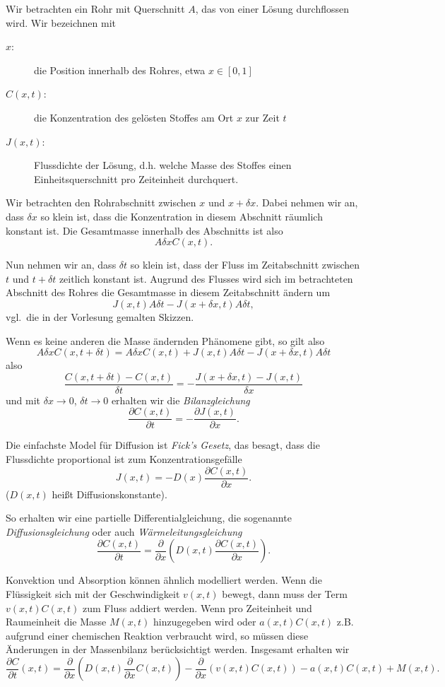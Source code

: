 \documentclass[12pt,a4paper]{book}
\theoremstyle{break}
\theoremstyle{nonumberplain}
\newcommand{\1}{\mathbbm{1}} 			      	%
\begin{document}
Wir betrachten ein Rohr mit Querschnitt $A$, das von einer Lösung durchflossen wird. Wir bezeichnen mit
\begin{description}
\item[$x$:] die Position innerhalb des Rohres, etwa $x\in [0,1]$
\item[$C(x,t)$:] die Konzentration des gelösten Stoffes 
am Ort $x$ zur Zeit $t$
\item[$J(x,t)$:] Flussdichte der Lösung, d.h. welche Masse des Stoffes
einen Einheitsquerschnitt pro Zeiteinheit durchquert.
\end{description}

Wir betrachten den Rohrabschnitt zwischen $x$ und $x+\delta x$. Dabei nehmen wir an, dass
$\delta x$ so klein ist, dass die Konzentration in diesem Abschnitt
räumlich konstant ist. Die Gesamtmasse innerhalb des Abschnitts ist also
\[
A \delta x C(x,t).
\]

Nun nehmen wir an, dass $\delta t$ so klein ist, dass der Fluss im Zeitabschnitt zwischen $t$ und $t+\delta t$ zeitlich konstant ist. Augrund des Flusses wird sich im betrachteten Abschnitt des Rohres die Gesamtmasse in diesem Zeitabschnitt ändern um
\[
J(x,t)A \delta t - J(x+\delta x,t) A \delta t,
\]
vgl.\ die in der Vorlesung gemalten Skizzen.

Wenn es keine anderen die Masse ändernden Phänomene gibt, so gilt also
\[
A\delta x C(x,t+\delta t)=A\delta x C(x,t) + J(x,t)A \delta t - J(x+\delta x,t) A \delta t
\]
also
\[
\frac{C(x,t+\delta t)-C(x,t)}{\delta t}=-\frac{J(x+\delta x,t)-J(x,t)}{\delta x}
\]
und mit $\delta x\to 0$, $\delta t\to 0$ erhalten wir die \emph{Bilanzgleichung}
\[
\frac{\partial C(x,t)}{\partial t}=-\frac{\partial J(x,t)}{\partial x}.
\]

Die einfachste Model für Diffusion ist \emph{Fick's Gesetz}, das besagt, dass die
Flussdichte proportional ist zum Konzentrationsgefälle
\[
J(x,t)=- D(x) \frac{\partial C(x,t)}{\partial x}.
\]
($D(x,t)$ heißt Diffusionskonstante). %

So erhalten wir eine partielle Differentialgleichung, die sogenannte
\emph{Diffusionsgleichung} oder auch \emph{Wärmeleitungsgleichung}
\[
\frac{\partial C(x,t)}{\partial t}=\frac{\partial}{\partial x} \left(D(x,t) \frac{\partial  C(x,t)}{\partial x}\right).
\]

Konvektion und Absorption können ähnlich modelliert werden. Wenn die Flüssigkeit sich
mit der Geschwindigkeit $v(x,t)$ bewegt, dann muss der Term $v(x,t)C(x,t)$ zum Fluss addiert werden. Wenn pro Zeiteinheit und Raumeinheit die Masse $M(x,t)$ hinzugegeben wird oder $a(x,t)C(x,t)$ z.B. aufgrund einer chemischen Reaktion verbraucht wird, so müssen diese
Änderungen in der Massenbilanz berücksichtigt werden.
Insgesamt erhalten wir 
\[
\frac{\partial C}{\partial t}(x,t) =   \frac{\partial}{\partial x} \left( D(x,t) \frac{\partial}{\partial x} C(x,t)\right) - \frac{\partial}{\partial x} (v(x,t) C(x,t)) - a(x,t)C(x,t) + M(x,t). 
\]
\end{document}
